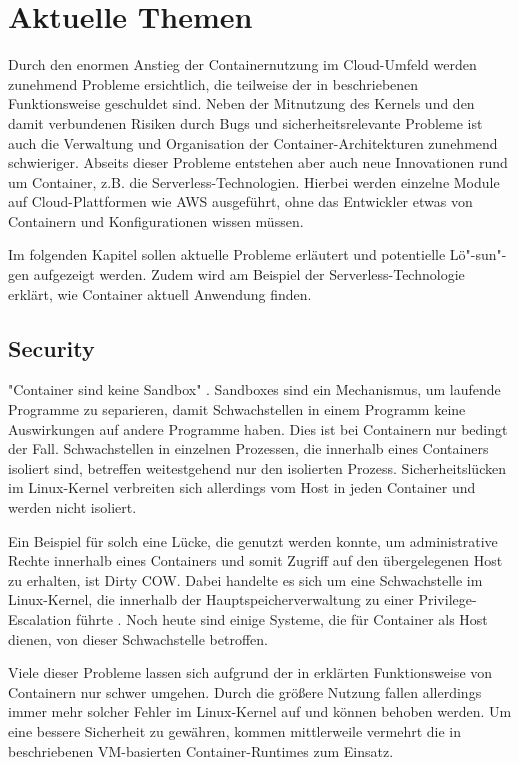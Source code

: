 \chapter{Aktuelle Themen}
\label{chap:aktuelles}

Durch den enormen Anstieg der Containernutzung im Cloud-Umfeld werden zunehmend Probleme ersichtlich, die teilweise der in  beschriebenen Funktionsweise geschuldet sind. Neben der Mitnutzung des Kernels und den damit verbundenen Risiken durch Bugs und sicherheitsrelevante Probleme ist auch die Verwaltung und Organisation der Container-Architekturen zunehmend schwieriger. Abseits dieser Probleme entstehen aber auch neue Innovationen rund um Container, z.B. die Serverless-Technologien. Hierbei werden einzelne Module auf Cloud-Plattformen wie AWS ausgeführt, ohne das Entwickler etwas von Containern und Konfigurationen wissen müssen.

Im folgenden Kapitel sollen aktuelle Probleme erläutert und potentielle Lö"-sun"-gen aufgezeigt werden. Zudem wird am Beispiel der Serverless-Technologie erklärt, wie Container aktuell Anwendung finden.

\section{Security}
\label{sec:aktuellesSecurity}

"Container sind keine Sandbox" \citep{OpenSourcingGVisoraSandboxedContainerRuntime}. Sandboxes sind ein Mechanismus, um laufende Programme zu separieren, damit Schwachstellen in einem Programm keine Auswirkungen auf andere Programme haben. Dies ist bei Containern nur bedingt der Fall. Schwachstellen in einzelnen Prozessen, die innerhalb eines Containers isoliert sind, betreffen weitestgehend nur den isolierten Prozess. Sicherheitslücken im Linux-Kernel verbreiten sich allerdings vom Host in jeden Container und werden nicht isoliert.

Ein Beispiel für solch eine Lücke, die genutzt werden konnte, um administrative Rechte innerhalb eines Containers und somit Zugriff auf den übergelegenen Host zu erhalten, ist Dirty COW. Dabei handelte es sich um eine Schwachstelle im Linux-Kernel, die innerhalb der Hauptspeicherverwaltung zu einer Privilege-Escalation führte \citep{DirtyCOWCVE20165195}. Noch heute sind einige Systeme, die für Container als Host dienen, von dieser Schwachstelle betroffen.

Viele dieser Probleme lassen sich aufgrund der in  erklärten Funktionsweise von Containern nur schwer umgehen. Durch die größere Nutzung fallen allerdings immer mehr solcher Fehler im Linux-Kernel auf und können behoben werden. Um eine bessere Sicherheit zu gewähren, kommen mittlerweile vermehrt die in  beschriebenen VM-basierten Container-Runtimes zum Einsatz.


